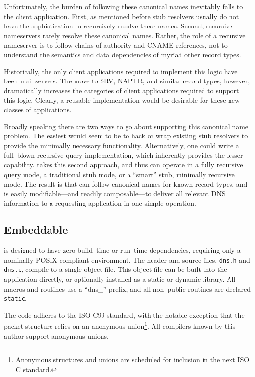 \documentclass[11pt]{article}
\begin{document}
Unfortunately, the burden of following these canonical names inevitably
falls to the client application. First, as mentioned before stub resolvers
usually do not have the sophistication to recursively resolve these names.
Second, recursive nameservers rarely resolve these canonical names. Rather,
the role of a recursive nameserver is to follow chains of authority and
CNAME references, not to understand the semantics and data dependencies of
myriad other record types.

Historically, the only client applications required to implement this logic
have been mail servers. The move to SRV, NAPTR, and similar record types,
however, dramatically increases the categories of client applications
required to support this logic. Clearly, a reusable implementation would be
desirable for these new classes of applications.

Broadly speaking there are two ways to go about supporting this canonical
name problem. The easiest would seem to be to hack or wrap existing stub
resolvers to provide the minimally necessary functionality. Alternatively,
one could write a full--blown recursive query implementation, which
inherently provides the lesser capability. \dnsc takes this second approach,
and thus can operate in a fully recursive query mode, a traditional stub
mode, or a ``smart'' stub, minimally recursive mode. The result is that
\dnsc can follow canonical names for known record types, and is easily
modifiable---and readily composable---to deliver all relevant DNS
information to a requesting application in one simple operation.

\subsection{Embeddable}

\dnsc is designed to have zero build--time or run--time dependencies,
requiring only a nominally \textsc{POSIX} compliant
environment. The header and source files, \texttt{dns.h} and \texttt{dns.c},
compile to a single object file. This object file can be built into the
application directly, or optionally installed as a static or dynamic
library. All macros and routines use a ``dns\_'' prefix, and all non--public
routines are declared \texttt{static}.

The code adheres to the ISO C99 standard, with the notable exception
that the packet structure relies on an anonymous union\footnote{Anonymous
structures and unions are scheduled for inclusion in the next ISO C
standard.}. All compilers known by this author support anonymous unions.
\end{document}
